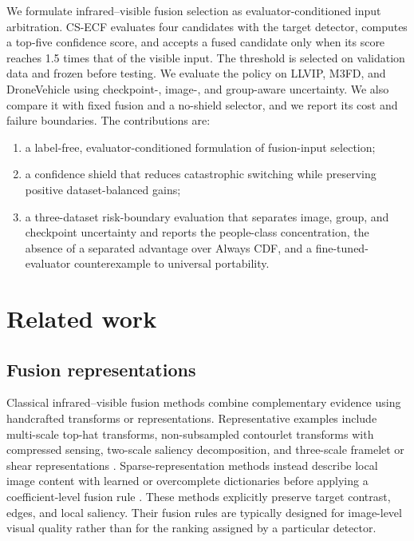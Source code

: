 \documentclass[preprint,11pt]{elsarticle}
\begin{document}
We formulate infrared--visible fusion selection as evaluator-conditioned input
arbitration. CS-ECF evaluates four candidates with the target detector,
computes a top-five confidence score, and accepts a fused candidate only when
its score reaches 1.5 times that of the visible input. The threshold is selected
on validation data and frozen before testing. We evaluate the policy on LLVIP,
M3FD, and DroneVehicle using checkpoint-, image-, and group-aware uncertainty. We
also compare it with fixed fusion and a no-shield selector, and we report its
cost and failure boundaries. The contributions are:
\begin{enumerate}
  \item a label-free, evaluator-conditioned formulation of fusion-input
  selection;
  \item a confidence shield that reduces catastrophic switching while
  preserving positive dataset-balanced gains;
  \item a three-dataset risk-boundary evaluation that separates image, group,
  and checkpoint uncertainty and reports the people-class concentration, the
  absence of a separated advantage over Always CDF, and a fine-tuned-evaluator
  counterexample to universal portability.
\end{enumerate}

\section{Related work}

\subsection{Fusion representations}

Classical infrared--visible fusion methods combine complementary evidence using
handcrafted transforms or representations. Representative examples include
multi-scale top-hat transforms, non-subsampled contourlet transforms with
compressed sensing, two-scale saliency decomposition, and three-scale framelet
or shear representations \cite{zhu2017tophat,zhang2016nsct,zhang2021twoscale,wei2017threescale}.
Sparse-representation methods instead describe local image content with learned
or overcomplete dictionaries before applying a coefficient-level fusion rule
\cite{yin2013sparsefusion,yin2015multiscale}. These methods explicitly preserve
target contrast, edges, and local saliency. Their fusion rules are typically
designed for image-level visual quality rather than for the ranking assigned by
a particular detector.
\end{document}
